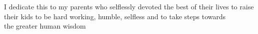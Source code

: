 \addvspace{4.25in}
\begin{center}\singlespacing
I dedicate this to my parents who selflessly devoted the best of their lives to raise their kids to be hard working, humble, selfless and to take steps towards \\the greater human wisdom\\
\end{center}
